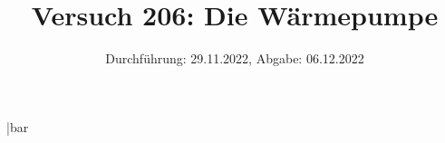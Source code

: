 
\usepackage{pdfpages}
\newcommand*\diff{\mathop{}\!\mathrm{d}}
\newcommand*\Diff[1]{\mathop{}\!\mathrm{d^#1}} %
\DeclareSIUnit\bar{bar}

\title{Versuch 206: Die Wärmepumpe}
\date{Durchführung: 29.11.2022, Abgabe: 06.12.2022}



\maketitle

\thispagestyle{empty} 
\tableofcontents
\newpage

\setcounter{page}{1}





\newpage





\printbibliography

\newpage


